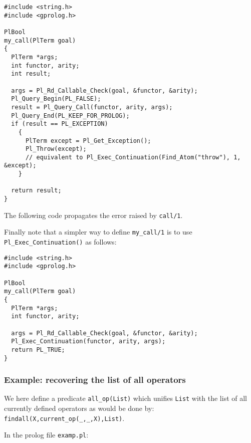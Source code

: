 \begin{Indentation}
\begin{verbatim}
#include <string.h>
#include <gprolog.h>

PlBool
my_call(PlTerm goal)
{
  PlTerm *args;
  int functor, arity;
  int result;

  args = Pl_Rd_Callable_Check(goal, &functor, &arity);
  Pl_Query_Begin(PL_FALSE);
  result = Pl_Query_Call(functor, arity, args);
  Pl_Query_End(PL_KEEP_FOR_PROLOG);
  if (result == PL_EXCEPTION)
    {
      PlTerm except = Pl_Get_Exception();
      Pl_Throw(except); 
      // equivalent to Pl_Exec_Continuation(Find_Atom("throw"), 1, &except);
    }

  return result;
}
\end{verbatim}
\end{Indentation}

The following code propagates the error raised by \texttt{call/1}.

\begin{CodeTwoCols}
\end{CodeTwoCols}

Finally note that a simpler way to define \texttt{my\_call/1} is to use
\texttt{Pl\_Exec\_Continuation()} as follows:

\begin{Indentation}
\begin{verbatim}
#include <string.h>
#include <gprolog.h>

PlBool
my_call(PlTerm goal)
{
  PlTerm *args;
  int functor, arity;

  args = Pl_Rd_Callable_Check(goal, &functor, &arity);
  Pl_Exec_Continuation(functor, arity, args);
  return PL_TRUE;
}
\end{verbatim}
\end{Indentation}

\subsubsection{Example: recovering the list of all operators}

We here define a predicate \texttt{all\_op(List)} which unifies
\texttt{List} with the list of all currently defined operators as would be done by: \texttt{findall(X,current\_op(\_,\_,X),List)}.

In the prolog file \texttt{examp.pl}:



